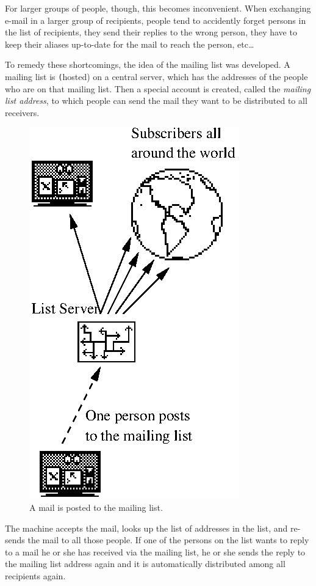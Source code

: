 \documentclass[a4paper]{report}
\newcommand{\Def}[1]{{\index{#1}\sl #1}}
\newcommand{\DefNI}[1]{{\tt #1}}
\begin{document}
For larger groups of people, though, this becomes inconvenient. When
exchanging e-mail in a larger group of recipients, people tend to
accidently forget persons in the list of recipients, they send their
replies to the wrong person, they have to keep their aliases
up-to-date for the mail to reach the person, etc\dots{}

To remedy these shortcomings, the idea of the mailing list was
developed. A mailing list is \DefNI(hosted) on a central server, which has the addresses of the people who
are on that mailing list. Then a special account is created, called
the \Def{mailing list address}, to which people can send the mail they
want to be distributed to all receivers.

\begin{figure}[bth]
\begin{center}
\includegraphics{ml-principle1.eps}
\caption{A mail is posted to the mailing list.}
\end{center}
\end{figure}

The machine accepts the mail, looks up the list of addresses in the
list, and re-sends the mail to all those people. If one of the persons
on the list wants to reply to a mail he or she has received via the
mailing list, he or she sends the reply to the mailing list address
again and it is automatically distributed among all recipients again.
\end{document}
